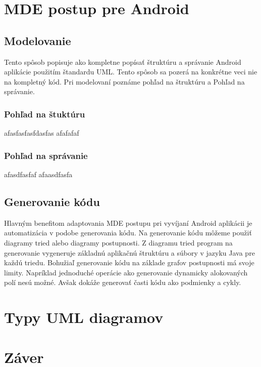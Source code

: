 \documentclass[10pt,twoside,slovak,a4paper]{article}
\begin{document}
\section{MDE postup pre Android} \label{MDE spôsob pre Android}

\subsection{Modelovanie}\label{MDE spôsob pre Android:Modelovanie}
Tento spôsob popisuje ako kompletne popísať štruktúru a správanie Android aplikácie použitím štandardu UML. Tento spôsob sa pozerá na konkrétne veci nie na kompletný kód. Pri modelovaní poznáme pohľad na štruktúru a Pohľad na správanie.

\subsubsection{Pohľad na štuktúru}\label{MDE spôsob pre Android:Modelovanie:Pohľad na štuktúru}
afasfasfasfdasfas
afafafaf

\subsubsection{Pohľad na správanie}\label{MDE spôsob pre Android:Modelovanie:Pohľad na správanie}
afasdfasfaf
afaasdfasfa


\subsection{Generovanie kódu}\label{Generovanie kódu}
Hlavným benefitom adaptovania MDE postupu pri vyvíjaní Android aplikácii je automatizácia v podobe generovania kódu. Na generovanie kódu môžeme použiť diagramy tried alebo diagramy postupnosti.\newline
Z diagramu tried program na generovanie vygeneruje základnú aplikačnú štruktúru a súbory v jazyku Java pre každú triedu.\newline
Bohužiaľ generovanie kódu na základe grafov postupnosti má svoje limity. Napríklad jednoduché operácie ako generovanie dynamicky alokovaných polí nesú možné. Avšak dokáže generovať časti kódu ako podmienky a cykly.


\section{Typy UML diagramov} \label{Typy UML diagramov}




\section{Záver} \label{zaver} %




\newpage

\end{document}
